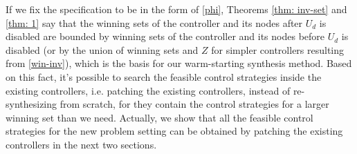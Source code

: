 

If we fix the specification to be in the form of \eqref{phi}, Theorems \ref{thm: inv-set} and \ref{thm: 1} say that the winning sets of the controller and its nodes after $ U_d $ is disabled are bounded by winning sets of the controller and its nodes before $ U_d $ is disabled (or by the union of winning sets and $ Z $ for simpler controllers resulting from \eqref{win-inv}), which is the basis for our warm-starting synthesis method. Based on this fact, it's possible to search the feasible control strategies inside the existing controllers, i.e. patching the existing controllers, instead of re-synthesizing from scratch, for they contain the control strategies for a larger winning set than we need. Actually, we show that all the feasible control strategies for the new problem setting can be obtained by patching the existing controllers in the next two sections.



